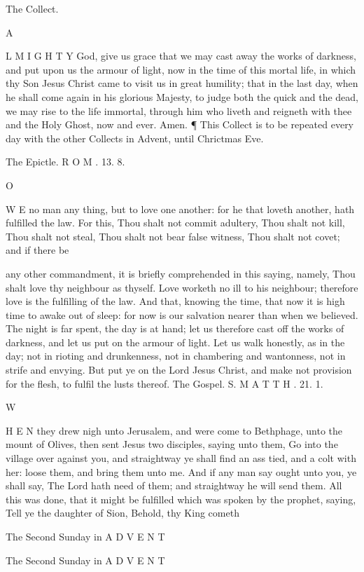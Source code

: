 The Collect.

A

L M I G H T Y God, give us grace that we may cast away the works of darkness, and put upon us the armour of light, now in the time of this mortal life, in which thy Son Jesus Christ came to visit us in great humility; that in the last day, when he shall come again in his glorious Majesty, to judge both the quick and the dead, we may rise to the life immortal, through him who liveth and reigneth with thee and the Holy Ghost, now and ever. Amen. ¶ This Collect is to be repeated every day with the other Collects in Advent, until Chrictmas Eve.

The Epictle. R O M . 13. 8.

O

W E no man any thing, but to love one another: for he that loveth another, hath fulfilled the law. For this, Thou shalt not commit adultery, Thou shalt not kill, Thou shalt not steal, Thou shalt not bear false witness, Thou shalt not covet; and if there be

any other commandment, it is briefly comprehended in this saying, namely, Thou shalt love thy neighbour as thyself. Love worketh no ill to his neighbour; therefore love is the fulfilling of the law. And that, knowing the time, that now it is high time to awake out of sleep: for now is our salvation nearer than when we believed. The night is far spent, the day is at hand; let us therefore cast off the works of darkness, and let us put on the armour of light. Let us walk honestly, as in the day; not in rioting and drunkenness, not in chambering and wantonness, not in strife and envying. But put ye on the Lord Jesus Christ, and make not provision for the flesh, to fulfil the lusts thereof. The Gospel. S. M A T T H . 21. 1.

W

H E N they drew nigh unto Jerusalem, and were come to Bethphage, unto the mount of Olives, then sent Jesus two disciples, saying unto them, Go into the village over against you, and straightway ye shall find an ass tied, and a colt with her: loose them, and bring them unto me. And if any man say ought unto you, ye shall say, The Lord hath need of them; and straightway he will send them. All this was done, that it might be fulfilled which was spoken by the prophet, saying, Tell ye the daughter of Sion, Behold, thy King cometh

The Second Sunday in A D V E N T

The Second Sunday in A D V E N T

